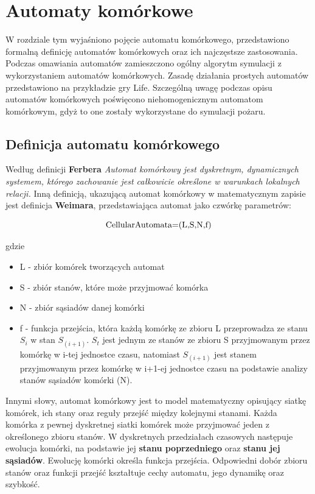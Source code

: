 ﻿%
\chapter{Automaty komórkowe}
\label{cha:Automaty komórkowe}
W rozdziale tym wyjaśniono pojęcie automatu komórkowego, przedstawiono formalną definicję automatów komórkowych oraz ich najczęstsze zastosowania. Podczas omawiania automatów zamieszczono ogólny algorytm symulacji z wykorzystaniem automatów komórkowych. Zasadę działania prostych automatów przedstawiono
na przykładzie gry Life. Szczególną uwagę podczas opisu 
 automatów komórkowych poświęcono niehomogenicznym automatom komórkowym, gdyż to one zostały wykorzystane
do symulacji pożaru. 
\section {Definicja automatu komórkowego}
Według definicji \textbf {Ferbera} \textsl{ Automat komórkowy jest dyskretnym, dynamicznych systemem, którego zachowanie jest
całkowicie określone w warunkach lokalnych relacji.}
Inną definicją, ukazującą automat komórkowy w matematycznym zapisie jest definicja \textbf{Weimara}, przedstawiająca
automat jako czwórkę parametrów:
\begin{Center}
\begin {equation}
\label{def_automatu}
$CellularAutomata=(L,S,N,f)$
\end {equation}
\end{Center}
gdzie
\begin{itemize}
\item L - zbiór komórek tworzących automat
\item S - zbiór stanów, które może przyjmować komórka
\item N - zbiór sąsiadów danej komórki
\item f - funkcja przejścia, która każdą komórkę ze zbioru L przeprowadza  ze stanu $S_i$ w stan $S_(i+1)$. $S_t$ jest jednym ze stanów
		ze zbioru S przyjmowanym przez komórkę w i-tej jednostce czasu, natomiast $S_(i+1)$ jest stanem przyjmowanym
		przez komórkę w i+1-ej jednostce czasu na podstawie analizy stanów sąsiadów komórki (N).
\end{itemize}
Innymi słowy, automat komórkowy jest to model matematyczny opisujący siatkę komórek, ich stany oraz reguły przejść
między kolejnymi stanami. Każda komórka z pewnej dyskretnej siatki komórek może przyjmować jeden z określonego zbioru stanów.
W dyskretnych przedziałach czasowych następuje ewolucja komórki, na podstawie jej \textbf{stanu poprzedniego} oraz \textbf{stanu jej sąsiadów}. Ewolucję komórki określa funkcja przejścia. Odpowiedni dobór zbioru stanów oraz funkcji przejść kształtuje cechy automatu, jego dynamikę oraz szybkość.
